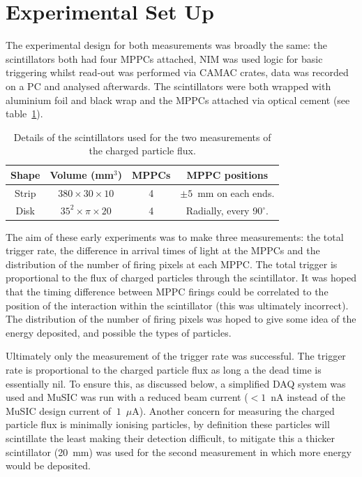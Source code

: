 \section{Experimental Set Up} %
\label{sec:experimental_set_up}
The experimental design for both measurements was broadly the same: the scintillators both had four MPPCs attached, NIM was used logic for basic triggering whilst read-out was performed via CAMAC crates, data was recorded on a PC and analysed afterwards. The scintillators were both wrapped with aluminium foil and black wrap and the MPPCs attached via optical cement (see table~\ref{tab:charged_particle_flux_scint_details}).
\begin{table}
  \begin{center}
    \begin{tabular}{c|c|c|c}
      Shape  &  Volume (mm\(^3\))            &  MPPCs  &  MPPC positions                    \\
      \hline
      Strip  &  \(380 \times30\times10\)     &  4      &  \( \pm 5 \)~mm on each ends.      \\
      Disk   &  \( 35^2\times\pi\times20\)  &  4      &  Radially, every 90\( ^{\circ} \). \\
        
    \end{tabular}
  \end{center}
  \caption{Details of the scintillators used for the two measurements of the charged particle flux.}
  \label{tab:charged_particle_flux_scint_details}
\end{table}

The aim of these early experiments was to make three measurements: the total trigger rate, the difference in arrival times of light at the MPPCs and the distribution of the number of firing pixels at each MPPC. The total trigger is proportional to the flux of charged particles through the scintillator. It was hoped that the timing difference between MPPC firings could be correlated to the position of the interaction within the scintillator (this was ultimately incorrect). The distribution of the number of firing pixels was hoped to give some idea of the energy deposited, and possible the types of particles. 

Ultimately only the measurement of the trigger rate was successful. The trigger rate is proportional to the charged particle flux as long a the dead time is essentially nil. To ensure this, as discussed below, a simplified DAQ system was used and MuSIC was run with a reduced beam current (\(<1\)~nA instead of the MuSIC design current of \(~1\)~\(\mu\)A). Another concern for measuring the charged particle flux is minimally ionising particles, by definition these particles will scintillate the least making their detection difficult, to mitigate this a thicker scintillator (20~mm) was used for the second measurement in which more energy would be deposited.

